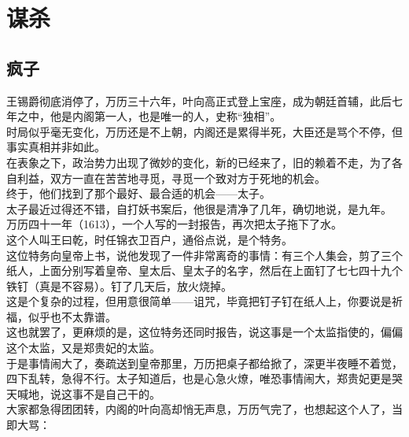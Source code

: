 \section{谋杀}
\ifnum{}
	\begin{multicols}{\theparacolNo}
\fi
\subsection{疯子}
王锡爵彻底消停了，万历三十六年，叶向高正式登上宝座，成为朝廷首辅，此后七年之中，他是内阁第一人，也是唯一的人，史称“独相”。\\

时局似乎毫无变化，万历还是不上朝，内阁还是累得半死，大臣还是骂个不停，但事实真相并非如此。\\

在表象之下，政治势力出现了微妙的变化，新的已经来了，旧的赖着不走，为了各自利益，双方一直在苦苦地寻觅，寻觅一个致对方于死地的机会。\\

终于，他们找到了那个最好、最合适的机会——太子。\\

太子最近过得还不错，自打妖书案后，他很是清净了几年，确切地说，是九年。\\

万历四十一年（1613），一个人写的一封报告，再次把太子拖下了水。\\

这个人叫王曰乾，时任锦衣卫百户，通俗点说，是个特务。\\

这位特务向皇帝上书，说他发现了一件非常离奇的事情：有三个人集会，剪了三个纸人，上面分别写着皇帝、皇太后、皇太子的名字，然后在上面钉了七七四十九个铁钉（真是不容易）。钉了几天后，放火烧掉。\\

这是个复杂的过程，但用意很简单——诅咒，毕竟把钉子钉在纸人上，你要说是祈福，似乎也不太靠谱。\\

这也就罢了，更麻烦的是，这位特务还同时报告，说这事是一个太监指使的，偏偏这个太监，又是郑贵妃的太监。\\

于是事情闹大了，奏疏送到皇帝那里，万历把桌子都给掀了，深更半夜睡不着觉，四下乱转，急得不行。太子知道后，也是心急火燎，唯恐事情闹大，郑贵妃更是哭天喊地，说这事不是自己干的。\\

大家都急得团团转，内阁的叶向高却悄无声息，万历气完了，也想起这个人了，当即大骂：\\


\end{multicols}
